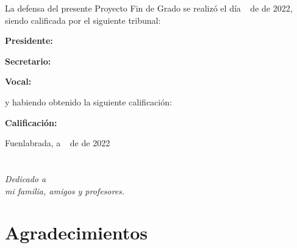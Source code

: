 \documentclass[a4paper, 12pt]{book}
\begin{document}
\vspace{1cm}
La defensa del presente Proyecto Fin de Grado se realizó el día \qquad$\;\,$ de \qquad\qquad\qquad\qquad \newline de 2022, siendo calificada por el siguiente tribunal:


\vspace{0.5cm}
\textbf{Presidente:}

\vspace{1.2cm}
\textbf{Secretario:}

\vspace{1.2cm}
\textbf{Vocal:}


\vspace{1.2cm}
y habiendo obtenido la siguiente calificación:

\vspace{1cm}
\textbf{Calificación:}


\vspace{1cm}
\begin{flushright}
Fuenlabrada, a \qquad$\;\,$ de \qquad\qquad\qquad\qquad de 2022
\end{flushright}


\chapter*{}
\begin{flushright}
\textit{Dedicado a \\
mi familia, amigos y profesores.}
\end{flushright}


\chapter*{Agradecimientos}

\end{document}
